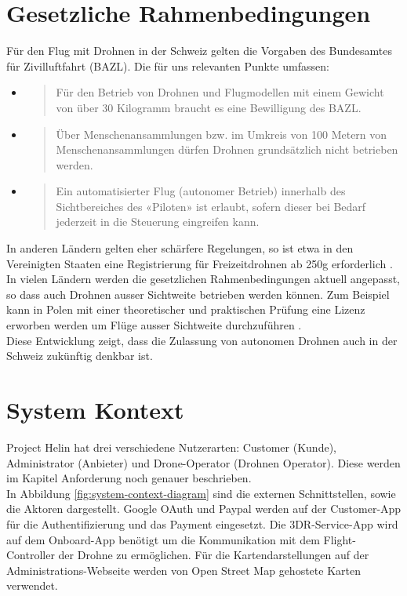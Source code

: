\section{Gesetzliche Rahmenbedingungen}
Für den Flug mit Drohnen in der Schweiz gelten die Vorgaben des Bundesamtes für Zivilluftfahrt (BAZL). Die für uns relevanten Punkte umfassen:
\begin{itemize}
	\item{\blockquote{Für den Betrieb von Drohnen und Flugmodellen mit einem Gewicht von über 30 Kilogramm braucht es eine Bewilligung des BAZL.} \cite{drohne-bazl}}
	\item{\blockquote{Über Menschenansammlungen bzw. im Umkreis von 100 Metern von Menschenansammlungen dürfen Drohnen grundsätzlich nicht betrieben werden.} \cite{drohne-bazl}}
	\item{\blockquote{Ein automatisierter Flug (autonomer Betrieb) innerhalb des Sichtbereiches des «Piloten» ist erlaubt, sofern dieser bei Bedarf jederzeit in die Steuerung eingreifen kann.}
	\cite{drohne-bazl}}
\end{itemize}
In anderen Ländern gelten eher schärfere Regelungen, so ist etwa in den Vereinigten Staaten eine Registrierung für Freizeitdrohnen ab 250g erforderlich \cite[]{pwc-drone}. In vielen Ländern werden die gesetzlichen Rahmenbedingungen aktuell angepasst, so dass auch Drohnen ausser Sichtweite betrieben werden können. Zum Beispiel kann in Polen mit einer theoretischer und praktischen Prüfung eine Lizenz erworben werden um Flüge ausser Sichtweite durchzuführen \cite[]{pwc-drone}.\\

Diese Entwicklung zeigt, dass die Zulassung von autonomen Drohnen auch in der Schweiz zukünftig denkbar ist. 

\section{System Kontext}

Project Helin hat drei verschiedene Nutzerarten: Customer (Kunde), Administrator (Anbieter) und Drone-Operator (Drohnen Operator). Diese werden im Kapitel Anforderung noch genauer beschrieben.\\

In Abbildung \ref{fig:system-context-diagram} sind die externen Schnittstellen, sowie die Aktoren dargestellt. Google OAuth und Paypal werden auf der Customer-App für die Authentifizierung und das Payment eingesetzt. Die 3DR-Service-App wird auf dem Onboard-App benötigt um die Kommunikation mit dem Flight-Controller der Drohne zu ermöglichen. Für die Kartendarstellungen auf der Administrations-Webseite werden von Open Street Map gehostete Karten verwendet.


